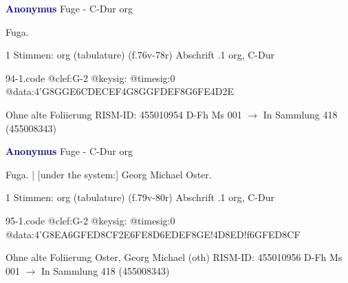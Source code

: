 \documentclass[twocolumn]{book}
\begin{document}
\newline \par \vspace{7pt} \textcolor{darkblue}{\textbf{Anonymus  }}
\newline Fuge - C-Dur
\newline org
\newline \begin{itshape}[f.76v, at left:] Fuga.\end{itshape} 
\newline \textcolor{darkblue}{}  1 Stimmen: org (tabulature)  (f.76v-78r)
\newline Abschrift
.1  org, C-Dur  
\begin{filecontents*}{94-1.code}
@clef:G-2
@keysig:
@timesig:0
@data:4'G{8GG}{E6CD}{ECEF}4G{8GG}{FDEF}{8G6FE}4D2E
\end{filecontents*}
\newline
%
\newline Ohne alte Foliierung
\newline RISM-ID: 455010954
\newline D-Fh  Ms 001
\newline $\rightarrow$ In Sammlung 418 (455008343)
      
\newline \par \vspace{7pt} \textcolor{darkblue}{\textbf{Anonymus  }}
\newline Fuge - C-Dur
\newline org
\newline \begin{itshape}[f.79v, at left:] Fuga. | [under the system:] Georg Michael Oster.\end{itshape} 
\newline \textcolor{darkblue}{}  1 Stimmen: org (tabulature)  (f.79v-80r)
\newline Abschrift
.1  org, C-Dur  
\begin{filecontents*}{95-1.code}
@clef:G-2
@keysig:
@timesig:0
@data:4'G{8EA}{6GFED}{8CF}2E{6FE8D}{6EDEF}{8GE}!4D{8ED}!f{6GFED}{8CF}
\end{filecontents*}
\newline
%
\newline Ohne alte Foliierung
\newline Oster, Georg Michael  (oth)
\newline RISM-ID: 455010956
\newline D-Fh  Ms 001
\newline $\rightarrow$ In Sammlung 418 (455008343)
      
\end{document}
